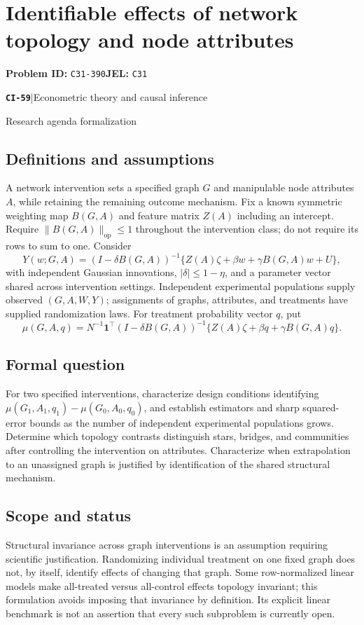 \documentclass[11pt,a4paper]{article}
\newcommand{\entrymeta}[3]{{\sffamily\small\color{muted}\textbf{\texttt{#1}}\quad|\quad #2\par #3\par}}
\begin{document}
\section*{Identifiable effects of network topology and node attributes}
\textbf{Problem ID:} \texttt{C31-390}\quad \textbf{JEL:} \texttt{C31}\par
\label{problem:OP-0538}
\label{beyond:CI-59}
\entrymeta{CI-59}{Econometric theory and causal inference}{Research agenda formalization}
\subsection*{Definitions and assumptions}
A network intervention sets a specified graph $G$ and manipulable node attributes $A$, while retaining the remaining outcome mechanism. Fix a known symmetric weighting map $B(G,A)$ and feature matrix $Z(A)$ including an intercept. Require $\|B(G,A)\|_{\mathrm{op}}\leq1$ throughout the intervention class; do not require its rows to sum to one. Consider
\[
 Y(w;G,A)=(I-\delta B(G,A))^{-1}
 \{Z(A)\zeta+\beta w+\gamma B(G,A)w+U\},
\]
with independent Gaussian innovations, $|\delta|\leq1-\eta$, and a parameter vector shared across intervention settings. Independent experimental populations supply observed $(G,A,W,Y)$; assignments of graphs, attributes, and treatments have supplied randomization laws. For treatment probability vector $q$, put
\[
 \mu(G,A,q)=N^{-1}\mathbf1^\top(I-\delta B(G,A))^{-1}
 \{Z(A)\zeta+\beta q+\gamma B(G,A)q\}.
\]
\subsection*{Formal question}
For two specified interventions, characterize design conditions identifying
$\mu(G_1,A_1,q_1)-\mu(G_0,A_0,q_0)$, and establish estimators and sharp squared-error bounds as the number of independent experimental populations grows. Determine which topology contrasts distinguish stars, bridges, and communities after controlling the intervention on attributes. Characterize when extrapolation to an unassigned graph is justified by identification of the shared structural mechanism.
\subsection*{Scope and status}
Structural invariance across graph interventions is an assumption requiring scientific justification. Randomizing individual treatment on one fixed graph does not, by itself, identify effects of changing that graph. Some row-normalized linear models make all-treated versus all-control effects topology invariant; this formulation avoids imposing that invariance by definition. Its explicit linear benchmark is not an assertion that every such subproblem is currently open.
\end{document}
